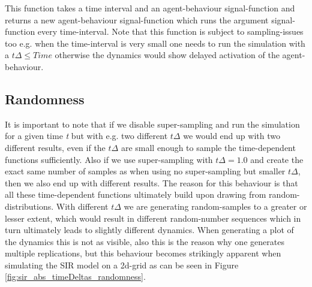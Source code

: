 This function takes a time interval and an agent-behaviour signal-function and returns a new agent-behaviour signal-function which runs the argument signal-function every time-interval. Note that this function is subject to sampling-issues too e.g. when the time-interval is very small one needs to run the simulation with a $t\Delta \leq Time$ otherwise the dynamics would show delayed activation of the agent-behaviour.

\subsection{Randomness}
It is important to note that if we disable super-sampling and run the simulation for a given time \textit{t} but with e.g. two different $t\Delta$ we would end up with two different results, even if the $t\Delta$ are small enough to sample the time-dependent functions sufficiently. Also if we use super-sampling with $t\Delta = 1.0$ and create the exact same number of samples as when using no super-sampling but smaller $t\Delta$, then we also end up with different results.
The reason for this behaviour is that all these time-dependent functions ultimately build upon drawing from random-distributions. With different $t\Delta$ we are generating random-samples to a greater or lesser extent, which would result in different random-number sequences which in turn ultimately leads to slightly different dynamics. When generating a plot of the dynamics this is not as visible, also this is the reason why one generates multiple replications, but this behaviour becomes strikingly apparent when simulating the SIR model on a 2d-grid as can be seen in Figure \ref{fig:sir_abs_timeDeltas_randomness}.


